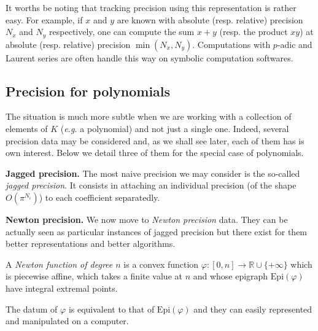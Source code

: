 \documentclass{sig-alternate-2013}
\newcommand{\R}{\mathbb R}
\newcommand{\Epi}{\textrm{Epi}}
\begin{document}
It worths be noting that tracking precision using this representation is 
rather easy. For example, if $x$ and $y$ are known with absolute (resp. 
relative) precision $N_x$ and $N_y$ respectively, one can compute the 
sum $x+y$ (resp. the product $xy$) at absolute (resp. relative) 
precision $\min(N_x,N_y)$. Computations with $p$-adic and Laurent
series are often handle this way on symbolic computation softwares.

\subsection{Precision for polynomials}

The situation is much more subtle when we are working with a collection 
of elements of $K$ (\emph{e.g.} a polynomial) and not just a single one.
Indeed, several precision data may be considered and, as we shall see
later, each of them has is own interest. Below we detail three of them
for the special case of polynomials.

\medskip

\noindent
{\bf Jagged precision.}
The most naive precision we may consider is the so-called \emph{jagged 
precision}. It consists in attaching an individual precision (of the
shape $O(\pi^{N_i})$) to each coefficient separatedly.

\medskip

\noindent
{\bf Newton precision.} 
We now move to \emph{Newton precision} data. They can be actually seen 
as particular instances of jagged precision but there exist for them 
better representations and better algorithms.

\begin{deftn}
A \emph{Newton function of degree $n$} is a convex function 
$\varphi : [0,n] \to \R \cup \{+\infty\}$ which is piecewise affine, 
which takes a finite value at $n$ and whose epigraph $\Epi(\varphi)$ 
have integral extremal points.
\end{deftn}

\begin{rem}
The datum of $\varphi$ is equivalent to that of $\Epi(\varphi)$ and they 
can easily represented and manipulated on a computer.
\end{rem}
\end{document}
